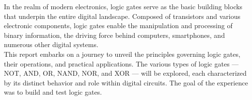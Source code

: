\abstract
In the realm of modern electronics, logic gates serve as the basic building blocks that underpin the entire digital landscape. 
Composed of transistors and various electronic components, logic gates enable the manipulation and processing of binary information, the driving force behind computers, smartphones, and numerous other digital systems. \\
This report embarks on a journey to unveil the principles governing logic gates, their operations, and practical applications. 
The various types of logic gates — NOT, AND, OR, NAND, NOR, and XOR — will be explored, each characterized by its distinct behavior and role within digital circuits.
The goal of the experience was to build and test logic gates. 